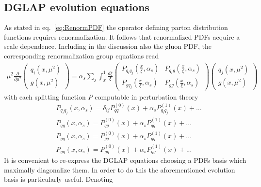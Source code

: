 \subsection{DGLAP evolution equations}
\label{sec:DGLAP}
As stated in eq.~\eqref{eq:RenormPDF} the operator defining parton distribution functions requires
renormalization. It follows that renormalized PDFs acquire a scale dependence.
Including in the discussion also the gluon PDF, the corresponding renormalization group equations read
\begin{align}
    \mu^2\frac{\partial}{\partial\mu^2}
    \begin{pmatrix}
        q_i\left(x,\mu^2\right) \\  
        g\left(x,\mu^2\right)
    \end{pmatrix}
    =
    \alpha_s\sum_{j}\int_x^1 \frac{d\xi}{\xi} 
    \begin{pmatrix}
        P_{q_i q_j}\left(\frac{x}{\xi},\alpha_s\right) & P_{q_i g}\left(\frac{x}{\xi},\alpha_s\right) \\
        P_{g q_j}\left(\frac{x}{\xi},\alpha_s\right)   & P_{g g}\left(\frac{x}{\xi},\alpha_s\right) 
    \end{pmatrix}
    \begin{pmatrix}
        q_j\left(x,\mu^2\right) \\  
        g\left(x,\mu^2\right)
    \end{pmatrix}
\end{align}
with each splitting function $P$ computable in perturbation theory
\begin{equation}
    \begin{split}
    &P_{q_i q_j}\left(x,\alpha_s\right) = \delta_{ij}P^{(0)}_{qq}\left(x\right) 
    + \alpha_s P^{(1)}_{q_i q_j}\left(x\right) + ... \\
    &P_{q g}\left(x,\alpha_s\right) = P^{(0)}_{qg}\left(x\right) 
    + \alpha_s P^{(1)}_{q g}\left(x\right) + ... \\
    &P_{g q}\left(x,\alpha_s\right) = P^{(0)}_{gq}\left(x\right) 
    + \alpha_s P^{(1)}_{gq}\left(x\right) + ... \\
    &P_{g g}\left(x,\alpha_s\right) = P^{(0)}_{gg}\left(x\right) 
    + \alpha_s P^{(1)}_{gg}\left(x\right) + ... 
    \end{split}
\end{equation}
It is convenient to re-express the DGLAP equations choosing a PDFs basis which maximally diagonalize them. 
In order to do this the aforementioned evolution basis is particularly useful.
Denoting 
